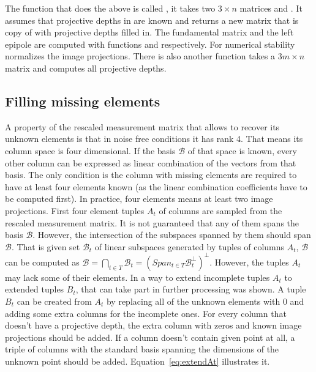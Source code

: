\documentclass[12pt]{article}
\begin{document}
The function that does the above is called , it
takes two $3 \times n$ matrices  and . It assumes that
projective depths in  are known and returns a new matrix that is copy of
 with projective depths filled in. The fundamental matrix and the left
epipole are computed with functions  and
 respectively. For numerical stability
 normalizes the image projections. There is also
another function  takes a $3m \times n$
matrix and computes all projective depths.

\subsection{Filling missing elements}

A property of the rescaled measurement matrix that allows to recover its unknown
elements is that in noise free conditions it has rank 4. That means its column
space is four dimensional. If the basis $\mathcal{B}$ of that space is known,
every other column can be expressed as linear combination of the vectors from
that basis. The only condition is the column with missing elements are required
to have at least four elements known (as the linear combination coefficients
have to be computed first). In practice, four elements means at least two image
projections. First four element tuples $A_t$ of columns are sampled from the
rescaled measurement matrix. It is not guaranteed that any of them spans the
basis $\mathcal{B}$. However, the intersection of the subspaces spanned by them
should span $\mathcal{B}$. That is given set $\mathcal{B}_t$ of linear subspaces
generated by tuples of columns $A_t$, $\mathcal{B}$ can be computed as
$\mathcal{B} = \bigcap_{t \in T} \! \mathcal{B}_t = (Span_{t \in T}
\mathcal{B}_t^\bot)^\bot$.  However, the tuples $A_t$ may lack some of their
elements. In \cite{svoboda04} a way to extend incomplete tuples $A_t$ to
extended tuples $B_t$, that can take part in further processing was shown. A
tuple $B_t$ can be created from $A_t$ by replacing all of the unknown elements
with $0$ and adding some extra columns for the incomplete ones. For  every
column that doesn't have a projective depth, the extra column with zeros and
known  image projections should be added. If a column doesn't contain given
point at all, a triple of columns with the standard basis spanning the
dimensions of the unknown point should be added. Equation~\ref{eq:extendAt}
illustrates it.
\end{document}
